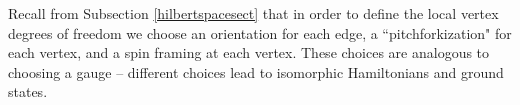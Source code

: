 \documentclass[12pt,a4paper]{article}
\newcommand{\kw}[1]{{\color{kwcolor}\footnotesize{(KW) #1}}}
\newcommand{\dave}[1]{{\color{ao(english)}\footnotesize{(DA) #1}}}
\begin{document}
Recall from Subsection \ref{hilbertspacesect} that 
in order to define the local vertex degrees of freedom we choose an orientation for each edge, a ``pitchforkization" for each vertex, and a spin framing at each vertex.
These choices are analogous to choosing a gauge -- different choices lead to isomorphic Hamiltonians and ground states.

\end{document}
